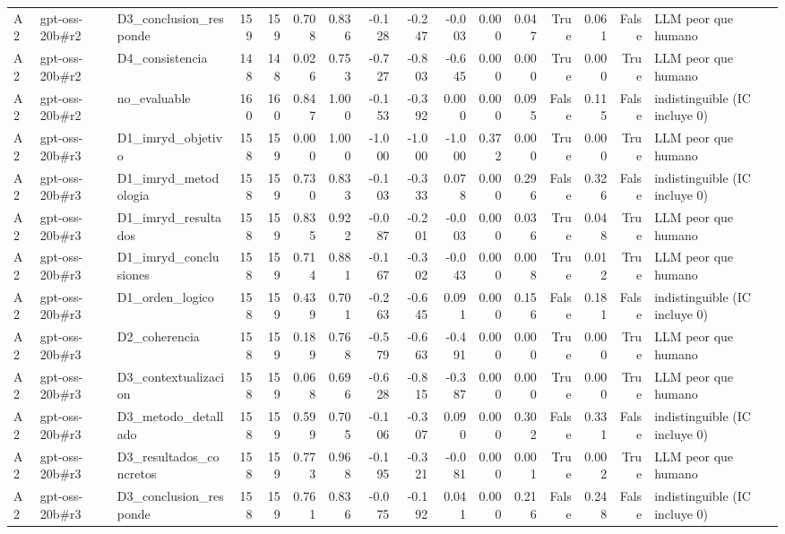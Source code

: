 \begin{table}
{\begin{tabular}{lllrrrrrrrrrrrrl}
A2 & gpt-oss-20b\#r2 & D3\_conclusion\_responde & 159 & 159 & 0.708 & 0.836 & -0.128 & -0.247 & -0.003 & 0.000 & 0.047 & True & 0.061 & False & LLM peor que humano \\
A2 & gpt-oss-20b\#r2 & D4\_consistencia & 148 & 148 & 0.026 & 0.753 & -0.727 & -0.803 & -0.645 & 0.000 & 0.000 & True & 0.000 & True & LLM peor que humano \\
A2 & gpt-oss-20b\#r2 & no\_evaluable & 160 & 160 & 0.847 & 1.000 & -0.153 & -0.392 & 0.000 & 0.000 & 0.095 & False & 0.115 & False & indistinguible (IC incluye 0) \\
A2 & gpt-oss-20b\#r3 & D1\_imryd\_objetivo & 158 & 159 & 0.000 & 1.000 & -1.000 & -1.000 & -1.000 & 0.372 & 0.000 & True & 0.000 & True & LLM peor que humano \\
A2 & gpt-oss-20b\#r3 & D1\_imryd\_metodologia & 158 & 159 & 0.730 & 0.833 & -0.103 & -0.333 & 0.078 & 0.000 & 0.296 & False & 0.326 & False & indistinguible (IC incluye 0) \\
A2 & gpt-oss-20b\#r3 & D1\_imryd\_resultados & 158 & 159 & 0.835 & 0.922 & -0.087 & -0.201 & -0.003 & 0.000 & 0.036 & True & 0.048 & True & LLM peor que humano \\
A2 & gpt-oss-20b\#r3 & D1\_imryd\_conclusiones & 158 & 159 & 0.714 & 0.881 & -0.167 & -0.302 & -0.043 & 0.000 & 0.008 & True & 0.012 & True & LLM peor que humano \\
A2 & gpt-oss-20b\#r3 & D1\_orden\_logico & 158 & 159 & 0.439 & 0.701 & -0.263 & -0.645 & 0.091 & 0.000 & 0.156 & False & 0.181 & False & indistinguible (IC incluye 0) \\
A2 & gpt-oss-20b\#r3 & D2\_coherencia & 158 & 159 & 0.189 & 0.768 & -0.579 & -0.663 & -0.491 & 0.000 & 0.000 & True & 0.000 & True & LLM peor que humano \\
A2 & gpt-oss-20b\#r3 & D3\_contextualizacion & 158 & 159 & 0.068 & 0.696 & -0.628 & -0.815 & -0.387 & 0.000 & 0.000 & True & 0.000 & True & LLM peor que humano \\
A2 & gpt-oss-20b\#r3 & D3\_metodo\_detallado & 158 & 159 & 0.599 & 0.705 & -0.106 & -0.307 & 0.090 & 0.000 & 0.302 & False & 0.331 & False & indistinguible (IC incluye 0) \\
A2 & gpt-oss-20b\#r3 & D3\_resultados\_concretos & 158 & 159 & 0.773 & 0.968 & -0.195 & -0.321 & -0.081 & 0.000 & 0.001 & True & 0.002 & True & LLM peor que humano \\
A2 & gpt-oss-20b\#r3 & D3\_conclusion\_responde & 158 & 159 & 0.761 & 0.836 & -0.075 & -0.192 & 0.041 & 0.000 & 0.216 & False & 0.248 & False & indistinguible (IC incluye 0) \\

\end{tabular}}
\end{table}
